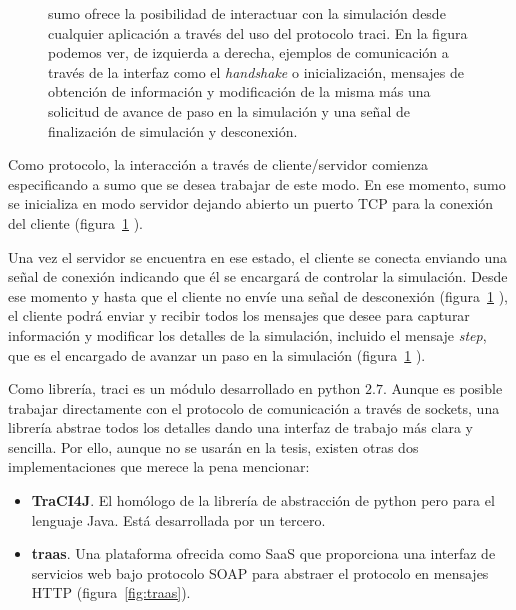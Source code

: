 \begin{figure}[!b]
	\centering
	\caption[Ejemplo de forma de envío de mensajes a través de TraCI]{\gls{sumo} ofrece la posibilidad de interactuar con la simulación desde cualquier aplicación a través del uso del protocolo \gls{traci}. En la figura podemos ver, de izquierda a derecha, ejemplos de comunicación a través de la interfaz como el \textit{handshake} o inicialización, mensajes de obtención de información y modificación de la misma más una solicitud de avance de paso en la simulación y una señal de finalización de simulación y desconexión.}
	\label{fig:traci-messages}
\end{figure}

Como protocolo, la interacción a través de cliente/servidor comienza especificando a \gls{sumo} que se desea trabajar de este modo. En ese momento, \gls{sumo} se inicializa en modo servidor dejando abierto un puerto TCP para la conexión del cliente (figura~\ref{fig:traci-messages} ).

Una vez el servidor se encuentra en ese estado, el cliente se conecta enviando una señal de conexión indicando que él se encargará de controlar la simulación. Desde ese momento y hasta que el cliente no envíe una señal de desconexión (figura~\ref{fig:traci-messages} ), el cliente podrá enviar y recibir todos los mensajes que desee para capturar información y modificar los detalles de la simulación, incluido el mensaje \textit{step}, que es el encargado de avanzar un paso en la simulación (figura~\ref{fig:traci-messages} ).

Como librería, \gls{traci} es un módulo desarrollado en \gls{python} $2$.$7$. Aunque es posible trabajar directamente con el protocolo de comunicación a través de sockets, una librería abstrae todos los detalles dando una interfaz de trabajo más clara y sencilla. Por ello, aunque no se usarán en la tesis, existen otras dos implementaciones que merece la pena mencionar:

\begin{itemize}
	\item \textbf{TraCI4J}. El homólogo de la librería de abstracción de \gls{python} pero para el lenguaje Java. Está desarrollada por un tercero.
	\item \textbf{\gls{traas}}. Una plataforma ofrecida como SaaS que proporciona una interfaz de servicios web bajo protocolo SOAP para abstraer el protocolo en mensajes HTTP (figura~\ref{fig:traas}).
\end{itemize}

